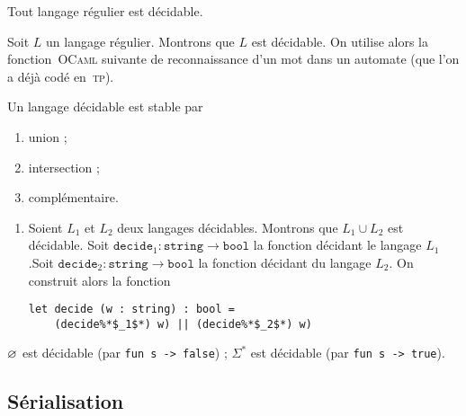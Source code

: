 
\begin{prop}
	Tout langage régulier est décidable.
\end{prop}

\begin{prv}
	Soit $L$\/ un langage régulier. Montrons que $L$\/ est décidable. On utilise alors la fonction~\textsc{OCaml} suivante de reconnaissance d'un mot dans un automate (que l'on a déjà codé en~\textsc{tp}).
\end{prv}

\begin{prop}
	Un langage décidable est stable par
	\begin{enumerate}
		\item union ;
		\item intersection ;
		\item complémentaire.
	\end{enumerate}
\end{prop}

\begin{prv}
	\begin{enumerate}
		\item Soient $L_1$\/ et $L_2$\/ deux langages décidables. Montrons que $L_1 \cup L_2$\/ est décidable. Soit $\texttt{decide}_1 : \texttt{string} \to \texttt{bool}$\/ la fonction décidant le langage $L_1$.\footnotemark\@ Soit $\texttt{decide}_2 : \texttt{string} \to \texttt{bool}$\/ la fonction décidant du langage $L_2$. On construit alors la fonction
			\begin{lstlisting}[language=caml,caption=Fonction \textsc{OCaml}reconnaissant l'union de deux langages décidables]
let decide (w : string) : bool =
	(decide%*$_1$*) w) || (decide%*$_2$*) w)
			\end{lstlisting}
	\end{enumerate}
\end{prv}

\begin{rmk}
	$\varnothing$\/ est décidable (par \verb|fun s -> false|) ; $\Sigma^*$\/ est décidable (par \verb|fun s -> true|).
\end{rmk}

\subsection{Sérialisation}

